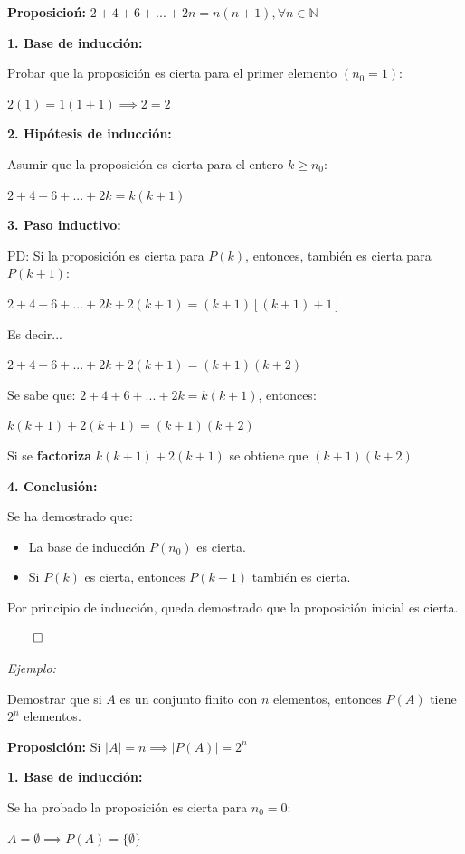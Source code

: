 \documentclass{article}
\begin{document}
\textbf{Proposicioń:} $2 + 4 + 6 + ... + 2n = n(n + 1), \forall n \in \mathbb{N}$

\textbf{1. Base de inducción:} 

Probar que la proposición es cierta para el primer elemento $(n_0 = 1)$:

$2(1) = 1(1 + 1) \implies 2 = 2$

\textbf{2. Hipótesis de inducción:}

Asumir que la proposición es cierta para el entero $k \ge n_0$:

$2 + 4 + 6 + ... + 2k = k(k + 1)$

\textbf{3. Paso inductivo:}

PD: Si la proposición es cierta para $P(k)$, entonces, también es cierta para $P(k + 1)$:

$2 + 4 + 6 + ... + 2k + 2(k + 1) = (k + 1)\left[(k + 1) + 1 \right]$

Es decir... 

$2 + 4 + 6 + ... + 2k + 2(k + 1) = (k + 1)(k + 2)$

Se sabe que: $2 + 4 + 6 + ... + 2k = k(k + 1)$, entonces:

$k(k + 1) + 2(k + 1) = (k + 1)(k + 2)$

Si se \textbf{factoriza} $k(k + 1) + 2(k + 1)$ se obtiene que $(k + 1)(k + 2)$

\textbf{4. Conclusión:} 

Se ha demostrado que:

\begin{itemize}
    \item La base de inducción $P(n_0)$ es cierta.
    \item Si $P(k)$ es cierta, entonces $P(k + 1)$ también es cierta.
\end{itemize}

Por principio de inducción, queda demostrado que la proposición inicial es cierta.

$\qed$

\textit{Ejemplo:}

Demostrar que si $A$ es un conjunto finito con $n$ elementos, entonces $P(A)$ tiene $2^n$ elementos.

\textbf{Proposición:} Si $\left| A\right| = n \implies \left|P(A)\right| = 2^n$

\textbf{1. Base de inducción:}

Se ha probado la proposición es cierta para $n_0 = 0$:

$A = \emptyset \implies P(A) = \{ \emptyset \}$
\end{document}
